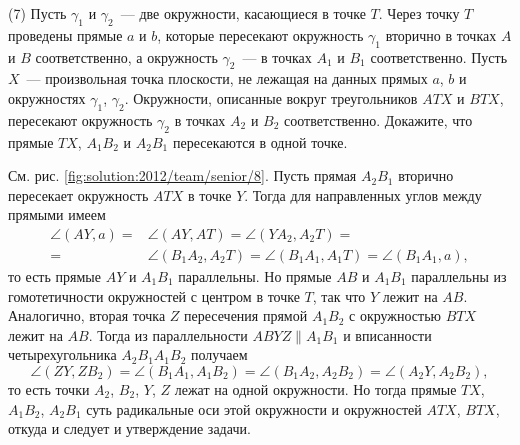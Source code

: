\textsf{(7)}
Пусть $\gamma_1$ и $\gamma_2$~--- две окружности, касающиеся в точке $T$.
Через точку $T$ проведены прямые $a$ и $b$, которые пересекают окружность $\gamma_1$ вторично в точках $A$ и $B$
соответственно, а окружность $\gamma_2$~--- в точках $A_1$ и $B_1$
соответственно.
Пусть $X$~--- произвольная точка плоскости, не лежащая на данных прямых $a$, $b$ и окружностях $\gamma_1$, $\gamma_2$.
Окружности, описанные вокруг треугольников $ATX$ и $BTX$, пересекают окружность $\gamma_2$ в точках $A_2$ и $B_2$ соответственно.
Докажите, что прямые $TX$, $A_1B_2$ и $A_2B_1$ пересекаются в одной точке.

%
\label{solution:2012/team/senior/8}%
См. рис. \ref{fig:solution:2012/team/senior/8}.
Пусть прямая $A_2 B_1$ вторично пересекает окружность $ATX$ в точке $Y$.
Тогда для направленных углов между прямыми имеем 
\begin{align*}
    \angle (AY, a)
={}&
    \angle (AY, AT)
=
    \angle (Y A_2, A_2 T)
=\\={}&
    \angle (B_1 A_2, A_2 T)
=
    \angle (B_1 A_1, A_1 T)
=
    \angle (B_1 A_1, a)
,\end{align*}
то есть прямые $AY$ и $A_1 B_1$ параллельны.
Но прямые $AB$ и $A_1 B_1$ параллельны из гомотетичности окружностей с центром
в точке $T$, так что $Y$ лежит на $AB$.
Аналогично, вторая точка $Z$ пересечения прямой $A_1 B_2$ с окружностью $BTX$
лежит на $AB$.
Тогда из параллельности $ABYZ \parallel A_1 B_1$ и вписанности четырехугольника
$A_2 B_1 A_1B_2$ получаем
\[
    \angle (ZY, ZB_2)
=
    \angle (B_1A_1,A_1B_2)
=
    \angle (B_1A_2,A_2B_2)
=
    \angle (A_2Y,A_2B_2)
,\]
то есть точки $A_2$, $B_2$, $Y$, $Z$ лежат на одной окружности.
Но тогда прямые $TX$, $A_1B_2$, $A_2B_1$ суть радикальные оси этой окружности и
окружностей $ATX$, $BTX$, откуда и следует и утверждение задачи.

